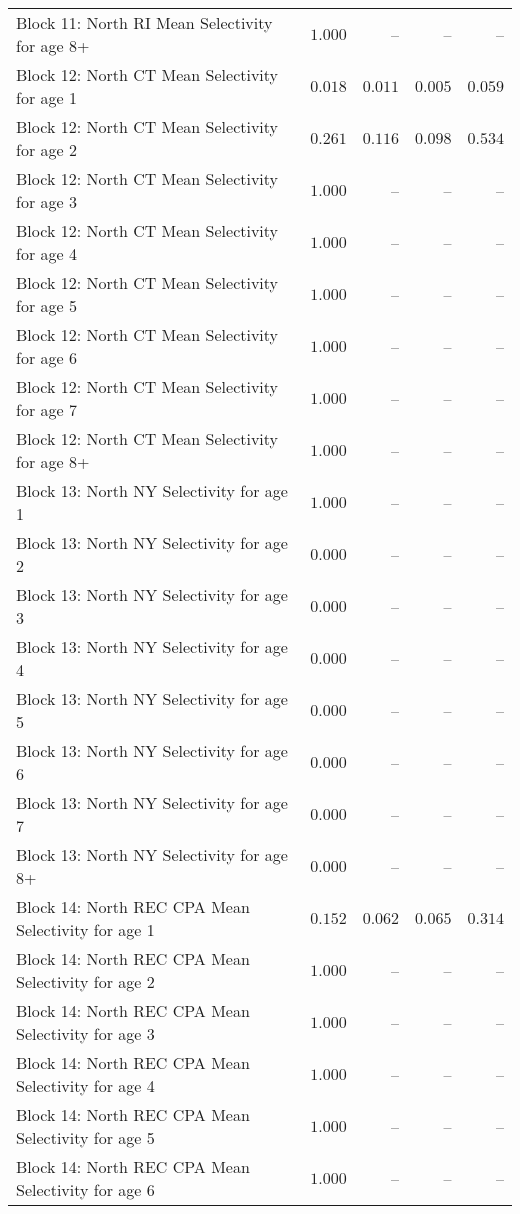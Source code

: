 \documentclass[
]{article}
\begin{document}
\begin{landscape}
\begin{longtable}[t]{lrrrr}
Block 11: North RI Mean Selectivity for age 8+ & $1.000$ & -- & -- & --\\
Block 12: North CT Mean Selectivity for age 1 & $0.018$ & $0.011$ & $0.005$ & $0.059$\\
\addlinespace
Block 12: North CT Mean Selectivity for age 2 & $0.261$ & $0.116$ & $0.098$ & $0.534$\\
Block 12: North CT Mean Selectivity for age 3 & $1.000$ & -- & -- & --\\
Block 12: North CT Mean Selectivity for age 4 & $1.000$ & -- & -- & --\\
Block 12: North CT Mean Selectivity for age 5 & $1.000$ & -- & -- & --\\
Block 12: North CT Mean Selectivity for age 6 & $1.000$ & -- & -- & --\\
\addlinespace
Block 12: North CT Mean Selectivity for age 7 & $1.000$ & -- & -- & --\\
Block 12: North CT Mean Selectivity for age 8+ & $1.000$ & -- & -- & --\\
Block 13: North NY Selectivity for age 1 & $1.000$ & -- & -- & --\\
Block 13: North NY Selectivity for age 2 & $0.000$ & -- & -- & --\\
Block 13: North NY Selectivity for age 3 & $0.000$ & -- & -- & --\\
\addlinespace
Block 13: North NY Selectivity for age 4 & $0.000$ & -- & -- & --\\
Block 13: North NY Selectivity for age 5 & $0.000$ & -- & -- & --\\
Block 13: North NY Selectivity for age 6 & $0.000$ & -- & -- & --\\
Block 13: North NY Selectivity for age 7 & $0.000$ & -- & -- & --\\
Block 13: North NY Selectivity for age 8+ & $0.000$ & -- & -- & --\\
\addlinespace
Block 14: North REC CPA Mean Selectivity for age 1 & $0.152$ & $0.062$ & $0.065$ & $0.314$\\
Block 14: North REC CPA Mean Selectivity for age 2 & $1.000$ & -- & -- & --\\
Block 14: North REC CPA Mean Selectivity for age 3 & $1.000$ & -- & -- & --\\
Block 14: North REC CPA Mean Selectivity for age 4 & $1.000$ & -- & -- & --\\
Block 14: North REC CPA Mean Selectivity for age 5 & $1.000$ & -- & -- & --\\
\addlinespace
Block 14: North REC CPA Mean Selectivity for age 6 & $1.000$ & -- & -- & --\\

\end{longtable}
\end{landscape}
\end{document}
